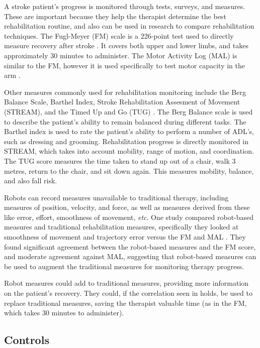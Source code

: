 \documentclass[12pt]{report}
\begin{document}
	A stroke patient's progress is monitored through tests, surveys, and measures. These are important because they help the therapist determine the best rehabilitation routine, and also can be used in research to compare rehabilitation techniques. The Fugl-Meyer (FM) scale is a 226-point test used to directly measure recovery after stroke \cite{Gladstone2002}. It covers both upper and lower limbs, and takes approximately 30 minutes to administer. The Motor Activity Log (MAL) is similar to the FM, however it is used specifically to test motor capacity in the arm \cite{Uswatte2006}.

Other measures commonly used for rehabilitation monitoring include the Berg Balance Scale, Barthel Index, Stroke Rehabilitation Assesment of Movement (STREAM), and the Timed Up and Go (TUG) \cite{Salbach2001}. The Berg Balance scale is used to describe the patient's ability to remain balanced during different tasks. The Barthel index is used to rate the patient's ability to perform a number of ADL's, such as dressing and grooming. Rehabilitation progress is directly monitored in STREAM, which takes into account mobility, range of motion, and coordination. The TUG score measures the time taken to stand up out of a chair, walk 3 metres, return to the chair, and sit down again. This measures mobility, balance, and also fall risk. 

Robots can record measures unavailable to traditional therapy, including measures of position, velocity, and force, as well as measures derived from these like error, effort, smoothness of movement, \textit{etc}. One study compared robot-based measures and traditional rehabilitation measures, specifically they looked at smoothness of movement and trajectory error versus the FM and MAL \cite{Celik2008}. They found significant agreement between the robot-based measures and the FM score, and moderate agreement against MAL, suggesting that robot-based measures can be used to augment the traditional measures for monitoring therapy progress. 

Robot measures could add to traditional measures, providing more information on the patient's recovery. They could, if the correlation seen in \cite{Celik2008} holds, be used to replace traditional measures, saving the therapist valuable time (as in the FM, which takes 30 minutes to administer). 

	
	\subsection{Controls} 
	
\end{document}
